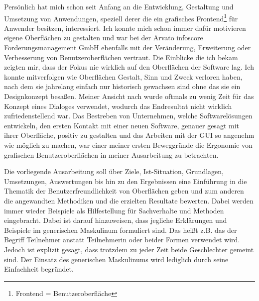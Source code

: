 Persönlich hat mich schon seit Anfang an die Entwicklung, Gestaltung und Umsetzung von Anwendungen, speziell derer die ein grafisches Frontend\footnote{Frontend = Benutzeroberfläche} für Anwender besitzen, interessiert. Ich konnte mich schon immer dafür motivieren eigene Oberflächen zu gestalten und war bei der Arvato infoscore Forderungsmanagement GmbH ebenfalls mit der Veränderung, Erweiterung oder Verbesserung von Benutzeroberflächen vertraut. Die Einblicke die ich bekam zeigten mir, dass der Fokus nie wirklich auf den Oberflächen der Software lag. Ich konnte mitverfolgen wie Oberflächen Gestalt, Sinn und Zweck verloren haben, nach dem sie jahrelang einfach nur historisch gewachsen sind ohne das sie ein Designkonzept besaßen. Meiner Ansicht nach wurde oftmals zu wenig Zeit für das Konzept eines Dialoges verwendet, wodurch das Endresultat nicht wirklich zufriedenstellend war. Das Bestreben von Unternehmen, welche Softwarelösungen entwickeln, den ersten Kontakt mit einer neuen Software, genauer gesagt mit ihrer Oberfläche, positiv zu gestalten und das Arbeiten mit der \gls{GUI} so angenehm wie möglich zu machen, war einer meiner ersten Beweggründe die Ergonomie von grafischen Benutzeroberflächen in meiner Ausarbeitung zu betrachten. 

Die vorliegende Ausarbeitung soll über Ziele, Ist-Situation, Grundlagen, Umsetzungen, Auswertungen bis hin zu den Ergebnissen eine Einführung in die Thematik der Benutzerfreundlichkeit von Oberflächen geben und zum anderen die angewandten Methodiken und die erzielten Resultate bewerten. Dabei werden immer wieder Beispiele als Hilfestellung für Sachverhalte und Methoden eingebracht. Dabei ist darauf hinzuweisen, dass jegliche Erklärungen und Beispiele im generischen Maskulinum formuliert sind. Das heißt z.B. das der Begriff Teilnehmer anstatt Teilnehmerin oder beider Formen verwendet wird. Jedoch ist explizit gesagt, dass trotzdem zu jeder Zeit beide Geschlechter gemeint sind. Der Einsatz des generischen Maskulinums wird lediglich durch seine Einfachheit begründet.
